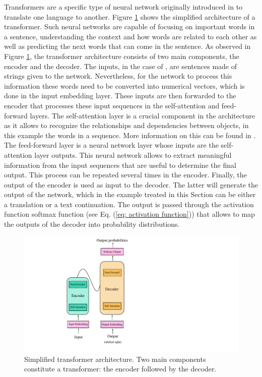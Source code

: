 Transformers are a specific type of neural network originally introduced in \cite{attentiontransformer} to translate one language to another. Figure \ref{fig: transformer architecture} shows the simplified architecture of a transformer. Such neural networks are capable of focusing on important words in a sentence, understanding the context and how words are related to each other as well as predicting the next words that can come in the sentence. As observed in Figure \ref{fig: transformer architecture}, the transformer architecture consists of two main components, the encoder and the decoder. The inputs, in the case of \cite{attentiontransformer}, are sentences made of strings given to the network. Nevertheless, for the network to process this information these words need to be converted into numerical vectors, which is done in the input embedding layer. These inputs are then forwarded to the encoder that processes these input sequences in the self-attention and feed-forward layers. The self-attention layer is a crucial component in the architecture as it allows to recognize the relationships and dependencies between objects, in this example the words in a sequence. More information on this can be found in \cite{attentiontransformer}. The feed-forward layer is a neural network layer whose inputs are the self-attention layer outputs. This neural network allows to extract meaningful information from the input sequences that are useful to determine the final output. This process can be repeated several times in the encoder. Finally, the output of the encoder is used as input to the decoder. The latter will generate the output of the network, which in the example treated in this Section can be either a translation or a text continuation. The output is passed through the activation function softmax function (see Eq. (\ref{eq: activation function})) that allows to map the outputs of the decoder into probability distributions.
\begin{figure}[hbt]
    \centering
    \includegraphics[width=0.4\linewidth]{Images/5.SPANet/transformer architecturepdf.pdf}
    \caption{Simplified transformer architecture. Two main components constitute a transformer: the encoder followed by the decoder.}
    \label{fig: transformer architecture}
\end{figure}


